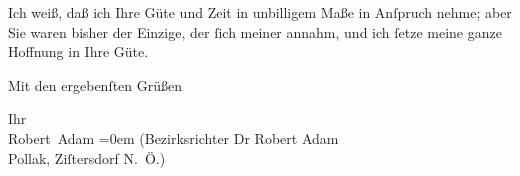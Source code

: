 \pstart
           Ich weiß, daß ich Ihre Güte und Zeit in unbilligem Maße in Anſpruch nehme; aber Sie
               waren bisher der Einzige, der ſich meiner annahm, und ich ſetze meine ganze Hoffnung
               in Ihre Güte.\pend
           
\pstart
           Mit den ergebenſten Grüßen\pend
           
\pstart
           Ihr{\\[\baselineskip]}\spacefill\mbox{Robert Adam}\pend
           \leftskip=0em{}
\pstart
           \noindent{}\raggedleft{}(Bezirksrichter Dr Robert Adam{\\}Pollak, Ziſtersdorf{ }\textsc{N. Ö.})\pend
           \endnumbering{}  
      